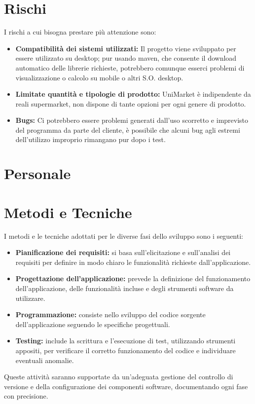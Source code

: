 \documentclass[a4paper,12pt]{article}
\begin{document}
\section{Rischi} %
I rischi a cui bisogna prestare più attenzione sono: 
\begin{itemize}
    \item \textbf{Compatibilità dei sistemi utilizzati:} 
    Il progetto viene sviluppato per essere utilizzato su desktop; pur usando maven, che consente il download automatico delle librerie richieste, potrebbero comunque esserci problemi di visualizzazione o calcolo su mobile o altri S.O. desktop. 
    \item \textbf{Limitate quantità e tipologie di prodotto:} 
    UniMarket è indipendente da reali supermarket, non dispone di tante opzioni per ogni genere di prodotto. 
    \item \textbf{Bugs:} 
    Ci potrebbero essere problemi generati dall’uso scorretto e imprevisto del programma da parte del cliente,
    è possibile che alcuni bug agli estremi dell’utilizzo improprio rimangano pur dopo i test. 
\end{itemize}

\section{Personale} %

\section{Metodi e Tecniche} %
I metodi e le tecniche adottati per le diverse fasi dello sviluppo sono i seguenti:
\begin{itemize}
    \item \textbf{Pianificazione dei requisiti:} si basa sull'elicitazione e sull'analisi dei requisiti per definire in modo chiaro le funzionalità richieste dall'applicazione.
    \item \textbf{Progettazione dell’applicazione:} prevede la definizione del funzionamento dell'applicazione, delle funzionalità incluse e degli strumenti software da utilizzare.
    \item \textbf{Programmazione:} consiste nello sviluppo del codice sorgente dell’applicazione seguendo le specifiche progettuali.
    \item \textbf{Testing:} include la scrittura e l’esecuzione di test, utilizzando strumenti appositi, per verificare il corretto funzionamento del codice e individuare eventuali anomalie.
\end{itemize}
Queste attività saranno supportate da un’adeguata gestione del controllo di versione e della configurazione dei componenti software, documentando ogni fase con precisione.
\end{document}
